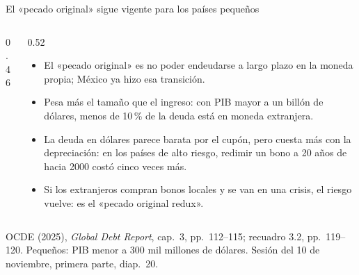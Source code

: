 \documentclass[aspectratio=169,11pt]{beamer}
\newcommand{\fuente}[1]{\par\vfill{\small\color{cGris}#1\par}}
\newcommand{\GDR}{OCDE (2025), \emph{Global Debt Report}}
\begin{document}
\begin{frame}{El «pecado original» sigue vigente para los países pequeños}
  \begin{columns}[T]
    \begin{column}{0.46\textwidth}
    \end{column}
    \begin{column}{0.52\textwidth}
      \small
      \begin{itemize}
        \item<1-> El «pecado original» es no poder endeudarse a largo plazo en la moneda propia; México ya hizo esa transición.
        \item<2-> Pesa más el tamaño que el ingreso: con PIB mayor a un billón de dólares, menos de 10\,\% de la deuda está en moneda extranjera.
        \item<3-> La deuda en dólares parece barata por el cupón, pero cuesta más con la depreciación: en los países de alto riesgo, redimir un bono a 20 años de hacia 2000 costó cinco veces más.
        \item<4-> Si los extranjeros compran bonos locales y se van en una crisis, el riesgo vuelve: es el «pecado original redux».
      \end{itemize}
    \end{column}
  \end{columns}
  \fuente{\GDR, cap.~3, pp.~112--115; recuadro 3.2, pp.~119--120. Pequeños: PIB menor a 300 mil millones de dólares. Sesión del 10 de noviembre, primera parte, diap.~20.}
\end{frame}
\end{document}
